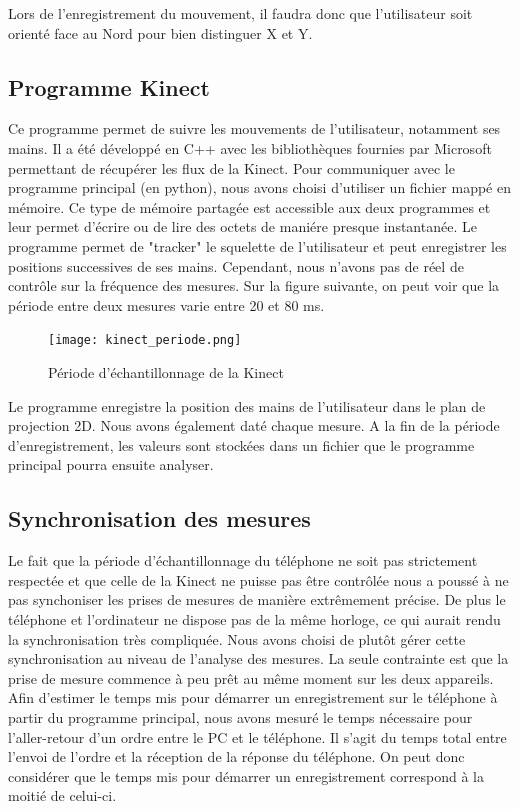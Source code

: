 \documentclass[12pt, french]{article}
\begin{document}
Lors de l'enregistrement du mouvement, il faudra donc que l'utilisateur soit orienté face au Nord pour bien distinguer X et Y.




\subsection{Programme Kinect}
Ce programme permet de suivre les mouvements de l'utilisateur, notamment ses mains. Il a été développé en C++ avec les bibliothèques fournies par Microsoft permettant de récupérer les flux de la Kinect.
Pour communiquer avec le programme principal (en python), nous avons choisi d'utiliser un fichier mappé en mémoire. Ce type de mémoire partagée est accessible aux deux programmes et leur permet d'écrire ou de lire des octets de maniére presque instantanée. Le programme permet de "tracker" le squelette de l'utilisateur et peut enregistrer les positions successives de ses mains. Cependant, nous n'avons pas de réel de contrôle sur la fréquence des mesures. Sur la figure suivante, on peut voir que la période entre deux mesures varie entre 20 et 80 ms.

\begin{figure}[H]
\centering
\texttt{[image: kinect\_periode.png]}
\caption{Période d'échantillonnage de la Kinect}
\label{fig4}
\end{figure}

Le programme enregistre la position des mains de l'utilisateur dans le plan de projection 2D. Nous avons également daté chaque mesure. A la fin de la période d'enregistrement, les valeurs sont stockées dans un fichier que le programme principal pourra ensuite analyser.


\subsection{Synchronisation des mesures}

Le fait que la période d'échantillonnage du téléphone ne soit pas strictement respectée et que celle de la Kinect ne puisse pas être contrôlée nous a poussé à ne pas synchoniser les prises de mesures de manière extrêmement précise. De plus le téléphone et l'ordinateur ne dispose pas de la même horloge, ce qui aurait rendu la synchronisation très compliquée. Nous avons choisi de plutôt gérer cette synchronisation au niveau de l'analyse des mesures. La seule contrainte est que la prise de mesure commence à peu prêt au même moment sur les deux appareils. Afin d'estimer le temps mis pour démarrer un enregistrement sur le téléphone à partir du programme principal, nous avons mesuré le temps nécessaire pour l'aller-retour d'un ordre entre le PC et le téléphone. Il s'agit du temps total entre l'envoi de l'ordre et la réception de la réponse du téléphone. On peut donc considérer que le temps mis pour démarrer un enregistrement correspond à la moitié de celui-ci.
\end{document}
